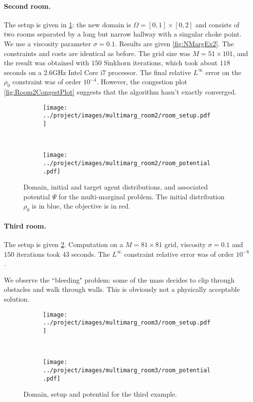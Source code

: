\documentclass[../report.tex]{subfiles}
\begin{document}
\paragraph{Second room.} The setup is given in \cref{fig:NMarg2DomainPot}: the new domain is $\Omega = [0,1] \times [0,2]$ and consists of two rooms separated by a long but narrow hallway with a singular choke point. We use a viscosity parameter $\sigma = 0.1$. Results are given \cref{fig:NMargEx2}. The constraints and costs are identical as before. The grid size was $M = 51 \times 101$, and the result was obtained with $150$ Sinkhorn iterations, which took about $118$ seconds on a 2.6GHz Intel Core i7 processor. The final relative $L^\infty$ error on the $\rho_0$ constraint was of order $10^{-4}$. However, the congestion plot \cref{fig:Room2CongestPlot} suggests that the algorithm hasn't exactly converged.

\begin{figure}[h]
	\centering
	\begin{subfigure}[b]{.3\linewidth}
	\texttt{[image: ../project/images/multimarg\_room2/room\_setup.pdf]}
	\end{subfigure}~
	\begin{subfigure}[b]{.39\linewidth}
	\texttt{[image: ../project/images/multimarg\_room2/room\_potential.pdf]}
	\end{subfigure}
	\caption{Domain, initial and target agent distributions, and associated potential $\Psi$ for the multi-marginal problem. The initial distribution $\rho_0$ is in blue, the objective is in red.}\label{fig:NMarg2DomainPot}
\end{figure}



\paragraph{Third room.} The setup is given \cref{fig:Room3}. Computation on a $M=81\times 81$ grid, viscosity $\sigma=0.1$ and $150$ iterations took $43$ seconds. The $L^\infty$ constraint relative error was of order $10^{-8}$.

We observe the ``bleeding" problem: some of the mass decides to clip through obstacles and walk through walls. This is obviously not a physically acceptable solution.

\begin{figure}[h]
	\centering
	\begin{subfigure}[c]{.3\linewidth}
	\texttt{[image: ../project/images/multimarg\_room3/room\_setup.pdf]}	
	\end{subfigure}~
	\begin{subfigure}[c]{.4\linewidth}
	\texttt{[image: ../project/images/multimarg\_room3/room\_potential.pdf]}	
	\end{subfigure}
	\caption{Domain, setup and potential for the third example.}\label{fig:Room3}
\end{figure}
\end{document}
